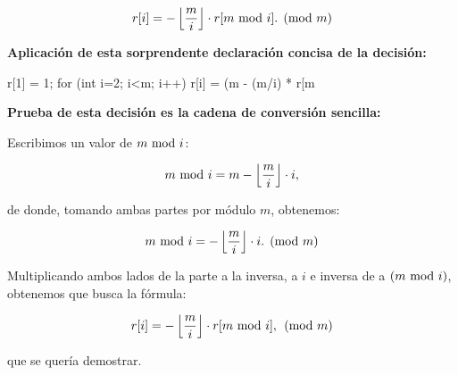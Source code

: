 $$ r[i] = - \left\lfloor \frac{m}{i} \right\rfloor \cdot r[m {\rm~mod~} i]. \pmod m $$

\bf{Aplicación} de esta sorprendente declaración concisa de la decisión:

\code
r[1] = 1;
for (int i=2; i<m; i++)
r[i] = (m - (m/i) * r[m%
\endcode

\bf{Prueba} de esta decisión es la cadena de conversión sencilla:

Escribimos un valor de $m {\rm~mod~} i$:

$$ m {\rm~mod~} i = m - \left\lfloor \frac{m}{i} \right\rfloor \cdot i, $$

de donde, tomando ambas partes por módulo $m$, obtenemos:

$$ m {\rm~mod~} i = - \left\lfloor \frac{m}{i} \right\rfloor \cdot i. \pmod m $$

Multiplicando ambos lados de la parte a la inversa, a $i$ e inversa de a $(m {\rm~mod~} i)$, obtenemos que busca la fórmula:

$$ r[i] = - \left\lfloor \frac{m}{i} \right\rfloor \cdot r[m {\rm~mod~} i], \pmod m $$

que se quería demostrar.
